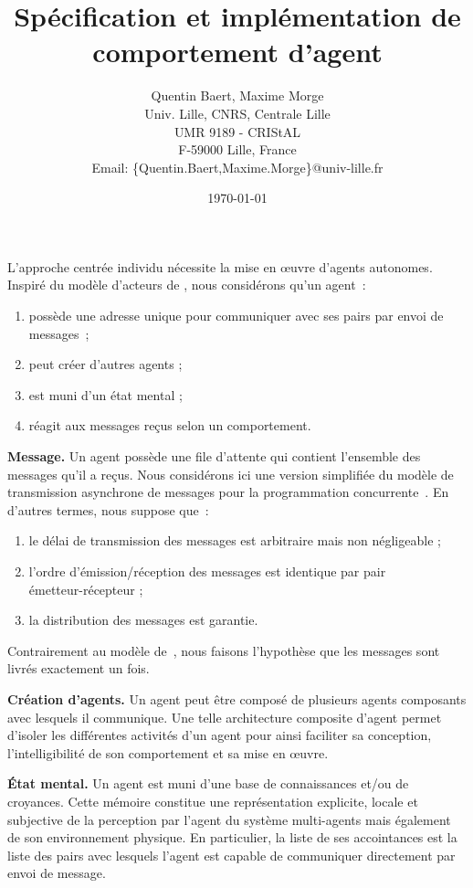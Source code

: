 \documentclass[a4paper, 11pt]{article}
\title{Spécification et implémentation de comportement d'agent}
\date{\today}
\author{Quentin Baert, Maxime Morge\\
Univ. Lille, CNRS, Centrale Lille\\
UMR 9189 - CRIStAL\\
F-59000 Lille, France\\
Email: \{Quentin.Baert,Maxime.Morge\}@univ-lille.fr
}
\begin{document}
\maketitle

L'approche centrée individu nécessite la mise en œuvre d'agents
autonomes. Inspiré du modèle d'acteurs de \cite{hewitt77aij}, nous
considérons qu'un agent~:
\begin{enumerate}
\item possède une adresse unique pour communiquer avec ses pairs par
  envoi de messages~;
\item peut créer d'autres agents ;
\item est muni d'un état mental ;
\item réagit aux messages reçus selon un comportement.
\end{enumerate}

\textbf{Message.} Un agent possède une file d'attente qui contient
l'ensemble des messages qu'il a reçus. Nous considérons ici une
version simplifiée du modèle de transmission asynchrone de messages
pour la programmation concurrente~\citep{clinger81foundations}. En
d'autres termes, nous suppose que~:
\begin{enumerate}
\item le délai de transmission des messages est arbitraire
mais non négligeable ;
\item l'ordre d'émission/réception des messages est identique par pair\\
  émetteur-récepteur ;
\item la distribution des messages est garantie.
\end{enumerate}
Contrairement au modèle
de~\cite{clinger81foundations}, nous faisons l'hypothèse que les
messages sont livrés exactement un fois.

\textbf{Création d'agents.} Un agent peut être composé de plusieurs
agents composants avec lesquels il communique. Une telle architecture
composite d'agent permet d'isoler les différentes activités d'un agent
pour ainsi faciliter sa conception, l'intelligibilité de son
comportement et sa mise en œuvre.

\textbf{État mental.} Un agent est muni d'une base de connaissances
et/ou de croyances. Cette mémoire constitue une représentation
explicite, locale et subjective de la perception par l'agent du
système multi-agents mais également de son environnement physique. En
particulier, la liste de ses accointances est la liste des pairs avec
lesquels l'agent est capable de communiquer directement par envoi de
message.
\end{document}
